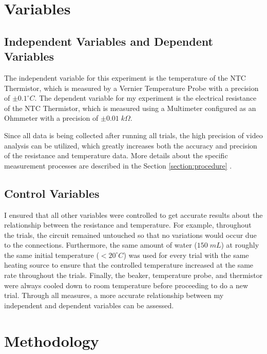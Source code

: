 \section{Variables}
\subsection{Independent Variables and Dependent Variables}
The independent variable for this experiment is the temperature of the NTC Thermistor, which is measured by a Vernier Temperature Probe with a precision of $\pm 0.1^\circ C$. The dependent variable for my experiment is the electrical resistance of the NTC Thermistor, which is measured using a Multimeter configured as an Ohmmeter with a precision of $\pm 0.01 \; k\Omega$.

Since all data is being collected after running all trials, the high precision of video analysis can be utilized, which greatly increases both the accuracy and precision of the resistance and temperature data. More details about the specific measurement processes are described in the Section \ref{section:procedure} .

\subsection{Control Variables}
I ensured that all other variables were controlled to get accurate results about the relationship between the resistance and temperature. For example, throughout the trials, the circuit remained untouched so that no variations would occur due to the connections. Furthermore, the same amount of water ($150 \; mL$) at roughly the same initial temperature ($<20^\circ C$) was used for every trial with the same heating source to ensure that the controlled temperature increased at the same rate throughout the trials. Finally, the beaker, temperature probe, and thermistor were always cooled down to room temperature before proceeding to do a new trial. Through all measures, a more accurate relationship between my independent and dependent variables can be assessed.

\section{Methodology}
